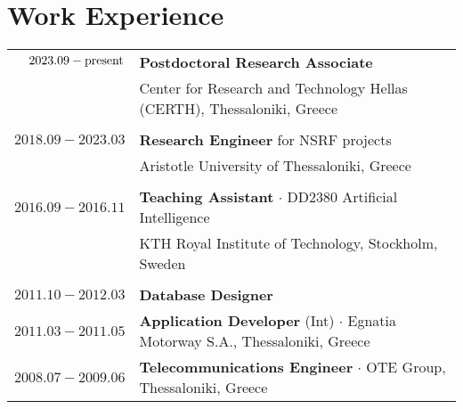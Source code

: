 \documentclass[a4paper,10pt,twoside]{article}
\begin{document}


\par{\bigskip\par}



\section{Work Experience}

\begin{tabular}{rp{12cm}}
$2023.09 - \hfill \textnormal{present} \hfill$ & \textbf{Postdoctoral Research Associate} \\
                    & Center for Research and Technology Hellas (CERTH), Thessaloniki, Greece\\
&\\
$2018.09 - 2023.03$ & \textbf{Research Engineer} for NSRF projects\\
                    & Aristotle University of Thessaloniki, Greece\\
&\\
$2016.09 - 2016.11$ & \textbf{Teaching Assistant} $\cdot$ DD2380 Artificial Intelligence\\
                    & KTH Royal Institute of Technology, Stockholm, Sweden\\
&\\
$2011.10 - 2012.03$ & \textbf{Database Designer}\\
$2011.03 - 2011.05$ & \textbf{Application Developer} (Int) $\cdot$ Egnatia Motorway S.A., Thessaloniki, Greece\\
$2008.07 - 2009.06$ & \textbf{Telecommunications Engineer} $\cdot$ OTE Group, Thessaloniki, Greece\\
\end{tabular} \\
\end{document}
